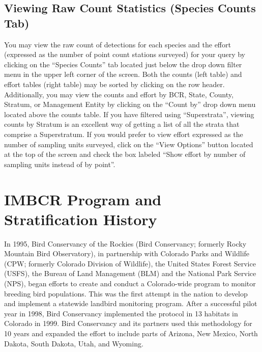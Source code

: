 \documentclass[
  letterpaper,
  DIV=11,
  numbers=noendperiod,
  oneside]{scrreprt}
\begin{document}
\hypertarget{viewing-raw-count-statistics-species-counts-tab}{%
\section*{Viewing Raw Count Statistics (Species Counts
Tab)}\label{viewing-raw-count-statistics-species-counts-tab}}


You may view the raw count of detections for each species and the effort
(expressed as the number of point count stations surveyed) for your
query by clicking on the ``Species Counts'' tab located just below the
drop down filter menu in the upper left corner of the screen. Both the
counts (left table) and effort tables (right table) may be sorted by
clicking on the row header. Additionally, you may view the counts and
effort by BCR, State, County, Stratum, or Management Entity by clicking
on the ``Count by'' drop down menu located above the counts table. If
you have filtered using ``Superstrata'', viewing counts by Stratum is an
excellent way of getting a list of all the strata that comprise a
Superstratum. If you would prefer to view effort expressed as the number
of sampling units surveyed, click on the ``View Options'' button located
at the top of the screen and check the box labeled ``Show effort by
number of sampling units instead of by point''.

\hypertarget{imbcr-program-and-stratification-history}{%
\chapter{IMBCR Program and Stratification
History}\label{imbcr-program-and-stratification-history}}

In 1995, Bird Conservancy of the Rockies (Bird Conservancy; formerly
Rocky Mountain Bird Observatory), in partnership with Colorado Parks and
Wildlife (CPW; formerly Colorado Division of Wildlife), the United
States Forest Service (USFS), the Bureau of Land Management (BLM) and
the National Park Service (NPS), began efforts to create and conduct a
Colorado-wide program to monitor breeding bird populations. This was the
first attempt in the nation to develop and implement a statewide
landbird monitoring program. After a successful pilot year in 1998, Bird
Conservancy implemented the protocol in 13 habitats in Colorado in 1999.
Bird Conservancy and its partners used this methodology for 10 years and
expanded the effort to include parts of Arizona, New Mexico, North
Dakota, South Dakota, Utah, and Wyoming.
\end{document}
